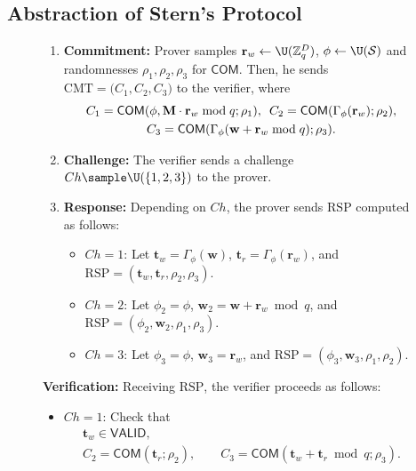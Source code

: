 \subsection{Abstraction of Stern's Protocol} \label{sse:stern-abstraction}

\begin{figure}[t]
  \small
  \begin{enumerate}
    \item \textbf{Commitment:} Prover samples $\mathbf{r}_w \leftarrow \U(\mathbb{Z}_q^D)$, $\phi \leftarrow  \U(\mathcal{S})$ and randomnesses $\rho_1, \rho_2, \rho_3$ for $\mathsf{COM}$.
      Then, he sends $\mathrm{CMT}= \big(C_1, C_2, C_3\big)$ to the verifier, where
      \begin{gather*}
        C_1 =  \mathsf{COM}(\phi, \mathbf{M}\cdot \mathbf{r}_w \bmod q; \rho_1), \hspace*{5pt}
        C_2 =  \mathsf{COM}(\Gamma_{\phi}(\mathbf{r}_w); \rho_2), \\
        C_3 =  \mathsf{COM}(\Gamma_{\phi}(\mathbf{w} + \mathbf{r}_w \bmod q); \rho_3).
      \end{gather*}

    \item \textbf{Challenge:} The verifier sends a challenge $Ch \sample \U(\{1,2,3\})$ to the prover.
    \item \textbf{Response:} Depending on $Ch$, the prover sends $\mathrm{RSP}$ computed as follows:
      \smallskip
      \begin{itemize}
        \item $Ch = 1$: Let $\mathbf{t}_{w} = \Gamma_{\phi}(\mathbf{w})$, $\mathbf{t}_{r} = \Gamma_{\phi}(\mathbf{r}_w)$, and $\mathrm{RSP} = (\mathbf{t}_w, \mathbf{t}_r, \rho_2, \rho_3)$. \smallskip

        \item $Ch = 2$: Let $\phi_2 = \phi$, $\mathbf{w}_2 = \mathbf{w} + \mathbf{r}_w \bmod q$, and
          $\mathrm{RSP} = (\phi_2, \mathbf{w}_2, \rho_1, \rho_3)$. \smallskip
        \item $Ch = 3$: Let $\phi_3 = \phi$, $\mathbf{w}_3 = \mathbf{r}_w$, and
          $\mathrm{RSP} = (\phi_3, \mathbf{w}_3, \rho_1, \rho_2)$.
      \end{itemize}
  \end{enumerate}
  \textbf{Verification:}  Receiving $\mathrm{RSP}$, the verifier proceeds as follows:
  \smallskip
  \begin{itemize}
    \item $Ch = 1$: Check that
      \begin{gather*}
        \mathbf{t}_w \in \mathsf{VALID},\\
        C_2 = \mathsf{COM}(\mathbf{t}_r; \rho_2), \qquad
        {C}_3 = \mathsf{COM}(\mathbf{t}_w + \mathbf{t}_r \bmod q; \rho_3).
      \end{gather*}


\end{itemize}
\end{figure}
